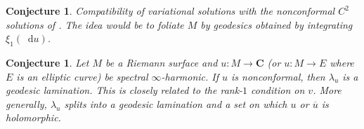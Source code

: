 \documentclass[reqno,11pt]{amsart}
\newcommand{\CC}{\mathbf{C}}
\newcommand*\dif{\mathop{}\!\mathrm{d}}
\newtheorem{conjecture}[theorem]{Conjecture}
\theoremstyle{definition}
\numberwithin{equation}{section}
\begin{document}
\begin{conjecture}
Compatibility of variational solutions with the nonconformal $C^2$ solutions of \cite{Sheffield2010VectorvaluedOL}.
The idea would be to foliate $M$ by geodesics obtained by integrating $\xi_1(\dif u)$.
\end{conjecture}

\begin{conjecture}
Let $M$ be a Riemann surface and $u: M \to \CC$ (or $u: M \to E$ where $E$ is an elliptic curve) be spectral $\infty$-harmonic.
If $u$ is nonconformal, then $\lambda_u$ is a geodesic lamination.
This is closely related to the rank-$1$ condition on $v$.
More generally, $\lambda_u$ splits into a geodesic lamination and a set on which $u$ or $\overline u$ is holomorphic.
\end{conjecture}


\printbibliography
\end{document}
